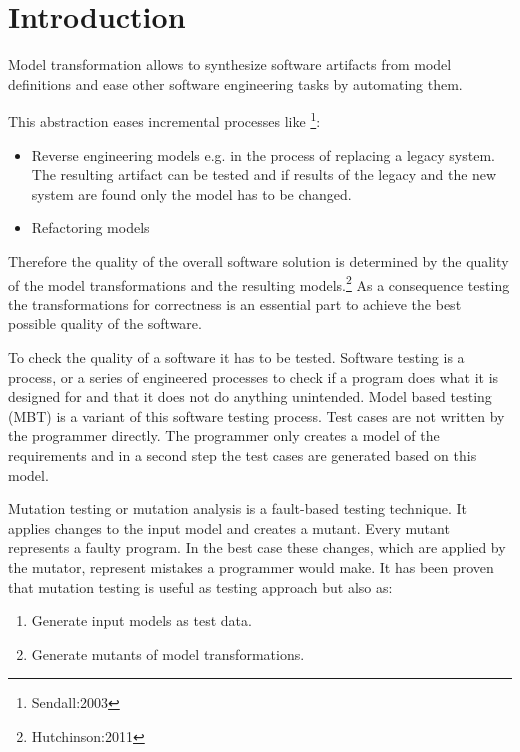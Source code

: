 \documentclass{llncs}
\begin{document}

\section{Introduction}

Model transformation allows to synthesize software artifacts from model definitions and ease other software engineering tasks by automating them.

This abstraction eases incremental processes like \footnote{Sendall:2003}:
\begin{itemize}
	\item Reverse engineering models e.g. in the process of replacing a legacy system. The resulting artifact can be tested and if results of the legacy and the new system are found only the model has to be changed.
	\item Refactoring models
\end{itemize}

Therefore the quality of the overall software solution is determined by the
quality of the model transformations and the resulting
models.\footnote{Hutchinson:2011} As a consequence testing the transformations
for correctness is an essential part to achieve the best possible quality of the software.\cite{troya:2015}

To check the quality of a software it has to be tested. Software testing is a process, or a series of engineered processes  to check if a program does what it is designed for and that it does not do anything unintended.\cite{Myers:2004} Model based testing (MBT) is a variant of this software testing process. Test cases are not written by the programmer directly. The programmer only creates a model of the requirements and in a second step the test cases are generated based on this model.\cite{Utting:2012}

Mutation testing or mutation analysis is a fault-based testing technique. It
applies changes to the input model and creates a mutant. Every mutant represents a faulty
program. In the best case these changes, which are applied by the mutator, represent mistakes a programmer would make. It has been proven that mutation testing is useful as testing approach but also as:\cite{mutationssurvey:yue}

\begin{enumerate}
	\item Generate input models as test data.
	\item Generate mutants of model transformations.
\end{enumerate}
\end{document}

